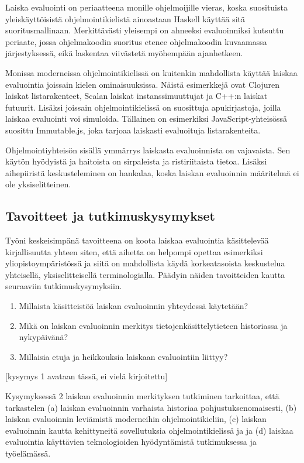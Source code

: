 Laiska evaluointi on periaatteena monille ohjelmoijille vieras, koska suosituista yleiskäyttöisistä ohjelmointikielistä ainoastaan Haskell käyttää sitä suoritusmallinaan. Merkittävästi yleisempi on ahneeksi evaluoinniksi kutsuttu periaate, jossa ohjelmakoodin suoritus etenee ohjelmakoodin kuvaamassa järjestyksessä, eikä laskentaa viivästetä myöhempään ajanhetkeen.

Monissa moderneissa ohjelmointikielissä on kuitenkin mahdollista käyttää laiskaa evaluointia joissain kielen ominaisuuksissa. Näistä esimerkkejä ovat Clojuren laiskat listarakenteet, Scalan laiskat instanssimuuttujat ja C++:n laiskat futuurit. Lisäksi joissain ohjelmointikielissä on suosittuja apukirjastoja, joilla laiskaa evaluointi voi simuloida. Tällainen on esimerkiksi JavaScript-yhteisössä suosittu Immutable.js, joka tarjoaa laiskasti evaluoituja listarakenteita.

Ohjelmointiyhteisön sisällä ymmärrys laiskasta evaluoinnista on vajavaista. Sen käytön hyödyistä ja haitoista on sirpaleista ja ristiriitaista tietoa. Lisäksi aihepiiristä keskusteleminen on hankalaa, koska laiskan evaluoinnin määritelmä ei ole yksiselitteinen.

\subsection{Tavoitteet ja tutkimuskysymykset}

Työni keskeisimpänä tavoitteena on koota laiskaa evaluointia käsittelevää kirjallisuutta yhteen siten, että aihetta on helpompi opettaa esimerkiksi yliopistoympäristössä ja siitä on mahdollista käydä korkeatasoista keskustelua yhteisellä, yksiselitteisellä terminologialla. Päädyin näiden tavoitteiden kautta seuraaviin tutkimuskysymyksiin.

\begin{enumerate}
  \item{Millaista käsitteistöä laiskan evaluoinnin yhteydessä käytetään?}
  \item{Mikä on laiskan evaluoinnin merkitys tietojenkäsittelytieteen historiassa ja nykypäivänä?}
  \item{Millaisia etuja ja heikkouksia laiskaan evaluointiin liittyy?}
\end{enumerate}

[kysymys 1 avataan tässä, ei vielä kirjoitettu]

Kysymyksessä 2 laiskan evaluoinnin merkityksen tutkiminen tarkoittaa, että tarkastelen (a) laiskan evaluoinnin varhaista historiaa pohjustuksenomaisesti, (b) laiskan evaluoinnin leviämistä moderneihin ohjelmointikieliin, (c) laiskan evaluoinnin kautta kehittyneitä sovellutuksia ohjelmointikielissä ja ja (d) laiskaa evaluointia käyttävien teknologioiden hyödyntämistä tutkimuksessa ja työelämässä.

